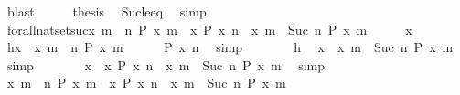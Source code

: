 \begin{isabellebody}
\ blast\isanewline
\ \ \isamarkupfalse%
\ \isamarkupfalse%
\ {\isacharquery}thesis\ \isamarkupfalse%
\ Suc{\isacharunderscore}le{\isacharunderscore}eq\ \isamarkupfalse%
\ simp\isanewline
{}\isamarkupfalse%
%
\endisatagproof
{\isafoldproof}%
%
\isadelimproof
\isanewline
%
\endisadelimproof
\isanewline
{}\isamarkupfalse%
\ forall{\isacharunderscore}nat{\isacharunderscore}set{\isacharunderscore}suc{\isacharcolon}{\isacartoucheopen}{\isacharbraceleft}x{\isachardot}\ {\isasymforall}m\ {\isasymge}\ n{\isachardot}\ P\ x\ m{\isacharbraceright}\ {\isacharequal}\ {\isacharbraceleft}x{\isachardot}\ P\ x\ n{\isacharbraceright}\ {\isasyminter}\ {\isacharbraceleft}x{\isachardot}\ {\isasymforall}m\ {\isasymge}\ Suc\ n{\isachardot}\ P\ x\ m{\isacharbraceright}{\isacartoucheclose}\isanewline
%
\isadelimproof
%
\endisadelimproof
%
\isatagproof
{}\isamarkupfalse%
\isanewline
\ \ \isacommand{{\isacharbraceleft}}\isamarkupfalse%
\ \isamarkupfalse%
\ x\ \isamarkupfalse%
\ h{\isacharcolon}{\isacartoucheopen}x\ {\isasymin}\ {\isacharbraceleft}x{\isachardot}\ {\isasymforall}m\ {\isasymge}\ n{\isachardot}\ P\ x\ m{\isacharbraceright}{\isacartoucheclose}\isanewline
\ \ \ \ \isamarkupfalse%
\ {\isacartoucheopen}P\ x\ n{\isacartoucheclose}\ \isamarkupfalse%
\ simp\isanewline
\ \ \ \ \isamarkupfalse%
\ \isamarkupfalse%
\ h\ \isamarkupfalse%
\ {\isacartoucheopen}x\ {\isasymin}\ {\isacharbraceleft}x{\isachardot}\ {\isasymforall}m\ {\isasymge}\ Suc\ n{\isachardot}\ P\ x\ m{\isacharbraceright}{\isacartoucheclose}\ \isamarkupfalse%
\ simp\isanewline
\ \ \ \ \isamarkupfalse%
\ \isamarkupfalse%
\ {\isacartoucheopen}x\ {\isasymin}\ {\isacharbraceleft}x{\isachardot}\ P\ x\ n{\isacharbraceright}\ {\isasyminter}\ {\isacharbraceleft}x{\isachardot}\ {\isasymforall}m\ {\isasymge}\ Suc\ n{\isachardot}\ P\ x\ m{\isacharbraceright}{\isacartoucheclose}\ \isamarkupfalse%
\ simp\isanewline
\ \ \isacommand{{\isacharbraceright}}\isamarkupfalse%
\ \isamarkupfalse%
\ {\isacartoucheopen}{\isacharbraceleft}x{\isachardot}\ {\isasymforall}m\ {\isasymge}\ n{\isachardot}\ P\ x\ m{\isacharbraceright}\ {\isasymsubseteq}\ {\isacharbraceleft}x{\isachardot}\ P\ x\ n{\isacharbraceright}\ {\isasyminter}\ {\isacharbraceleft}x{\isachardot}\ {\isasymforall}m\ {\isasymge}\ Suc\ n{\isachardot}\ P\ x\ m{\isacharbraceright}{\isacartoucheclose}\ \isacommand{{\isachardot}{\isachardot}}\isamarkupfalse%

\end{isabellebody}
